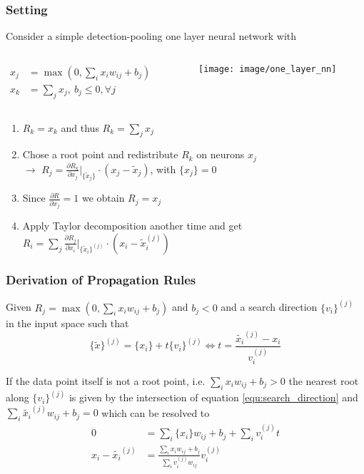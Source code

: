 \documentclass{beamer}
\begin{document}
\begin{frame}
\frametitle{Setting}
\vspace{0.2cm}
Consider a simple detection-pooling one layer neural network with
 \begin{columns}
          \begin{column}[T]{5.5cm}
		\begin{align*}
		x_j &= \max(0, \sum_i x_iw_{ij} + b_j)\\
		x_k &= \sum_j x_j, \ b_j \leq 0, \forall j
		\end{align*}
            \end{column} 
            \begin{column}[T]{6.5cm}
			\begin{figure}
				\texttt{[image: image/one\_layer\_nn]}
			\end{figure}
	\end{column}
\end{columns} 
\begin{enumerate}
\item $R_k = x_k$ and thus $R_k = \sum_j x_j$
\item  Chose a root point and redistribute $R_k$ on neurons $x_j$\\
$\rightarrow$ $R_j = \frac{\partial R_k}{\partial x_j}\Big|_{\{\tilde{x}_j\}} \cdot (x_j - \tilde{x}_j) $, with $\{x_j\}=0$
\item Since $\frac{\partial R}{\partial x_j}=1$ we obtain $R_j = x_j$
\item Apply Taylor decomposition another time and get\\
 $R_i = \sum_j\frac{\partial R_j}{\partial x_i}\Big|_{\{\tilde{x}_i\}^{(j)}} \cdot (x_i - \tilde{x}_i^{(j)})$
\end{enumerate}



\end{frame}


\begin{frame}
\frametitle{Derivation of Propagation Rules}
Given $R_j = \max(0, \sum_i x_iw_{ij} + b_j)$ and $b_j <0$ and a search direction $\{v_i\}^{(j)}$ in the input space such that
\vspace{-0.35cm}
\begin{equation}
\{\tilde{x}\}^{(j)} = \{x_i\} + t \{v_i \} ^{(j)} \Leftrightarrow t = \frac{\tilde{x_i}^{(j)} - x_i}{v_i^{(j)}}
\label{equ:search_direction}
\end{equation}
\vspace{-0.35cm}

If the data point itself is not a root point, i.e. $\sum_i x_i w_{ij} + b_j>0$ the nearest root along $\{v_i\}^{(j)}$ is given by the intersection of equation \eqref{equ:search_direction} and $\sum_i\tilde{ x_i}^{(j)} w_{ij} + b_j=0$ which can be resolved to 
\vspace{-0.25cm}
\begin{align*}
0 &= \sum_i\{x_i\}w_{ij} + b_j + \sum_i v_i^{(j)} t \\
x_i - \tilde{x_i}^{(j)} & = \frac{\sum_i x_i w_{ij} + b_j}{\sum_i v_i^{(j)} w_{ij}} v_i^{(j)}
\end{align*}

\end{frame}
\end{document}

